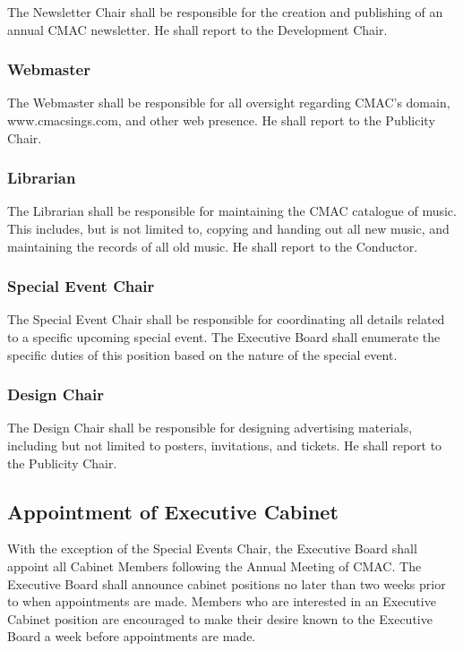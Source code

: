 \documentclass{article}
\begin{document}
The Newsletter Chair shall be responsible for the creation and publishing
of an annual CMAC newsletter. He shall report to the Development Chair.


\subsubsection{Webmaster}

The Webmaster shall be responsible for all oversight regarding CMAC's
domain, www.cmacsings.com, and other web presence. He shall report to the
Publicity Chair.


\subsubsection{Librarian}

The Librarian shall be responsible for maintaining the CMAC catalogue
of music. This includes, but is not limited to, copying and handing
out all new music, and maintaining the records of all old music. He
shall report to the Conductor.


\subsubsection{Special Event Chair}

The Special Event Chair shall be responsible for coordinating all
details related to a specific upcoming special event. The Executive
Board shall enumerate the specific duties of this position based on
the nature of the special event.


\subsubsection{Design Chair}

The Design Chair shall be responsible for designing advertising materials,
including but not limited to posters, invitations, and tickets. He
shall report to the Publicity Chair.

\subsection{Appointment of Executive Cabinet}

With the exception of the Special Events Chair, the Executive Board
shall appoint all Cabinet Members following the Annual Meeting of
CMAC. The Executive Board shall announce cabinet positions no later
than two weeks prior to when appointments are made. Members who are
interested in an Executive Cabinet position are encouraged to make
their desire known to the Executive Board a week before appointments
are made.
\end{document}
